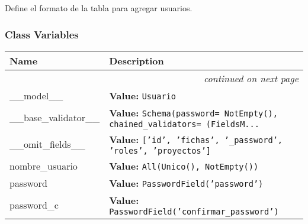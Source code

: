 Define el formato de la tabla para agregar usuarios.



  \subsubsection{Class Variables}

    \vspace{-1cm}
\hspace{\varindent}\begin{longtable}{|p{\varnamewidth}|p{\vardescrwidth}|l}
\cline{1-2}
\cline{1-2} \centering \textbf{Name} & \centering \textbf{Description}& \\
\cline{1-2}
\endhead\cline{1-2}\multicolumn{3}{r}{\small\textit{continued on next page}}\\\endfoot\cline{1-2}
\endlastfoot\raggedright \_\-\_\-m\-o\-d\-e\-l\-\_\-\_\- & \raggedright \textbf{Value:} 
{\tt Usuario}&\\
\cline{1-2}
\raggedright \_\-\_\-b\-a\-s\-e\-\_\-v\-a\-l\-i\-d\-a\-t\-o\-r\-\_\-\_\- & \raggedright \textbf{Value:} 
{\tt Schema(password= NotEmpty(), chained\_validators= (FieldsM\texttt{...}}&\\
\cline{1-2}
\raggedright \_\-\_\-o\-m\-i\-t\-\_\-f\-i\-e\-l\-d\-s\-\_\-\_\- & \raggedright \textbf{Value:} 
{\tt ['id', 'fichas', '\_password', 'roles', 'proyectos']}&\\
\cline{1-2}
\raggedright n\-o\-m\-b\-r\-e\-\_\-u\-s\-u\-a\-r\-i\-o\- & \raggedright \textbf{Value:} 
{\tt All(Unico(), NotEmpty())}&\\
\cline{1-2}
\raggedright p\-a\-s\-s\-w\-o\-r\-d\- & \raggedright \textbf{Value:} 
{\tt PasswordField('password')}&\\
\cline{1-2}
\raggedright p\-a\-s\-s\-w\-o\-r\-d\-\_\-c\- & \raggedright \textbf{Value:} 
{\tt PasswordField('confirmar\_password')}&\\
\cline{1-2}
\end{longtable}



